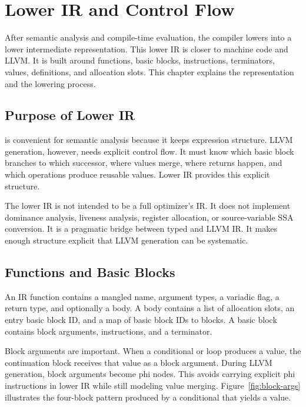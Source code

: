 \chapter{Lower IR and Control Flow}
\label{chap:lower-ir}

After semantic analysis and compile-time evaluation, the compiler lowers
\irtree{} into a lower intermediate representation. This lower IR is closer to
machine code and LLVM. It is built around functions, basic blocks, instructions,
terminators, values, definitions, and allocation slots. This chapter explains
the representation and the lowering process.

\section{Purpose of Lower IR}

\irtree{} is convenient for semantic analysis because it keeps expression
structure. LLVM generation, however, needs explicit control flow. It must know
which basic block branches to which successor, where values merge, where returns
happen, and which operations produce reusable values. Lower IR provides this
explicit structure.

The lower IR is not intended to be a full optimizer's IR. It does not implement
dominance analysis, liveness analysis, register allocation, or source-variable
SSA conversion. It is a pragmatic bridge between typed \irtree{} and LLVM IR.
It makes enough structure explicit that LLVM generation can be systematic.

\section{Functions and Basic Blocks}

An IR function contains a mangled name, argument types, a variadic flag, a return
type, and optionally a body. A body contains a list of allocation slots, an entry
basic block ID, and a map of basic block IDs to blocks. A basic block contains
block arguments, instructions, and a terminator.

Block arguments are important. When a conditional or loop produces a value, the
continuation block receives that value as a block argument. During LLVM
generation, block arguments become phi nodes. This avoids carrying explicit phi
instructions in lower IR while still modeling value merging.
Figure~\ref{fig:block-args} illustrates the four-block pattern produced by a
conditional that yields a value.


